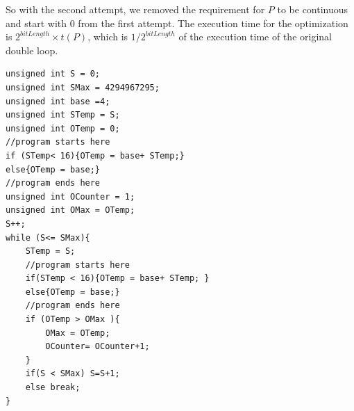 So with the second attempt, we removed the requirement for $P$ to be continuous and start with $0$ from the first attempt. The execution time for the optimization is $2^{bitLength} \times t(P)$, which is $1/2^{bitLength}$ of the execution time of the original double loop.


\lstset{language=C}  
\begin{lstlisting}[float=!h, caption={Implementation of the optimization with sanity check in C.},label=lst:2ndTry]
unsigned int S = 0;
unsigned int SMax = 4294967295;
unsigned int base =4;
unsigned int STemp = S;
unsigned int OTemp = 0;
//program starts here
if (STemp< 16){OTemp = base+ STemp;}
else{OTemp = base;}
//program ends here
unsigned int OCounter = 1;
unsigned int OMax = OTemp;
S++; 
while (S<= SMax){
	STemp = S;
	//program starts here
	if(STemp < 16){OTemp = base+ STemp;	}
	else{OTemp = base;}
	//program ends here
	if (OTemp > OMax ){
		OMax = OTemp;
		OCounter= OCounter+1;
	}
	if(S < SMax) S=S+1;
	else break;
}
\end{lstlisting}
